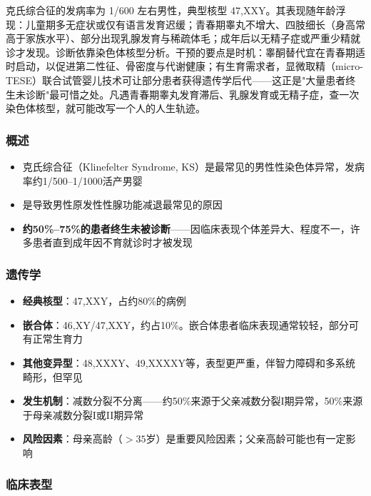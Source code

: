 \documentclass[12pt,a4paper,twoside]{ctexbook}
\begin{document}
克氏综合征的发病率为 1/600 左右男性，典型核型 47,XXY。其表现随年龄浮现：儿童期多无症状或仅有语言发育迟缓；青春期睾丸不增大、四肢细长（身高常高于家族水平）、部分出现乳腺发育与稀疏体毛；成年后以无精子症或严重少精就诊才发现。诊断依靠染色体核型分析。干预的要点是时机：睾酮替代宜在青春期适时启动，以促进第二性征、骨密度与代谢健康；有生育需求者，显微取精（micro-TESE）联合试管婴儿技术可让部分患者获得遗传学后代——这正是"大量患者终生未诊断"最可惜之处。凡遇青春期睾丸发育滞后、乳腺发育或无精子症，查一次染色体核型，就可能改写一个人的人生轨迹。

\subsubsection{概述}

\begin{itemize}[leftmargin=2cm]
	\item 克氏综合征（Klinefelter Syndrome, KS）是最常见的男性性染色体异常，发病率约1/500--1/1000活产男婴
	\item 是导致男性原发性性腺功能减退最常见的原因
	\item \textbf{约50\%--75\%的患者终生未被诊断}——因临床表现个体差异大、程度不一，许多患者直到成年因不育就诊时才被发现
\end{itemize}

\subsubsection{遗传学}

\begin{itemize}[leftmargin=2cm]
	\item \textbf{经典核型}：47,XXY，占约80\%的病例
	\item \textbf{嵌合体}：46,XY/47,XXY，约占10\%。嵌合体患者临床表现通常较轻，部分可有正常生育力
	\item \textbf{其他变异型}：48,XXXY、49,XXXXY等，表型更严重，伴智力障碍和多系统畸形，但罕见
	\item \textbf{发生机制}：减数分裂不分离——约50\%来源于父亲减数分裂I期异常，50\%来源于母亲减数分裂I或II期异常
	\item \textbf{风险因素}：母亲高龄（$>35$岁）是重要风险因素；父亲高龄可能也有一定影响
\end{itemize}

\subsubsection{临床表型}
\end{document}
